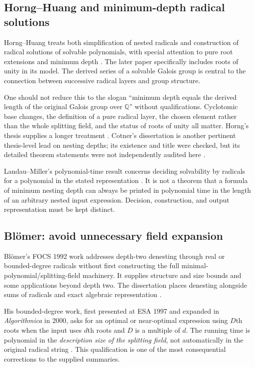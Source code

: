 \documentclass[11pt,a4paper]{article}
\numberwithin{equation}{section}
\theoremstyle{definition}\newtheorem{definition}[theorem]{Definition}
\theoremstyle{remark}\newtheorem{remark}[theorem]{Remark}
\newcommand{\Q}{\mathbb Q}\newcommand{\R}{\mathbb R}\newcommand{\C}{\mathbb C}\newcommand{\Z}{\mathbb Z}
\begin{document}
\subsection{Horng--Huang and minimum-depth radical solutions}
Horng--Huang treats both simplification of nested radicals and construction of radical solutions of solvable polynomials, with special attention to pure root extensions and minimum depth \cite{horng90,horng99}. The later paper specifically includes roots of unity in its model. The derived series of a solvable Galois group is central to the connection between successive radical layers and group structure.

One should not reduce this to the slogan ``minimum depth equals the derived length of the original Galois group over $\Q$'' without qualifications. Cyclotomic base changes, the definition of a pure radical layer, the chosen element rather than the whole splitting field, and the status of roots of unity all matter. Horng's thesis supplies a longer treatment \cite{horngThesis}. Cotner's dissertation is another pertinent thesis-level lead on nesting depths; its existence and title were checked, but its detailed theorem statements were not independently audited here \cite{cotner}.

Landau--Miller's polynomial-time result concerns deciding solvability by radicals for a polynomial in the stated representation \cite{landauMiller}. It is not a theorem that a formula of minimum nesting depth can always be printed in polynomial time in the length of an arbitrary nested input expression. Decision, construction, and output representation must be kept distinct.

\subsection{Bl\"omer: avoid unnecessary field expansion}
Bl\"omer's FOCS 1992 work addresses depth-two denesting through real or bounded-degree radicals without first constructing the full minimal-polynomial/splitting-field machinery. It supplies structure and size bounds and some applications beyond depth two. The dissertation places denesting alongside sums of radicals and exact algebraic representation \cite{bloemer92,bloemer93}.

His bounded-degree work, first presented at ESA 1997 and expanded in \emph{Algorithmica} in 2000, asks for an optimal or near-optimal expression using $D$th roots when the input uses $d$th roots and $D$ is a multiple of $d$. The running time is polynomial in the \emph{description size of the splitting field}, not automatically in the original radical string \cite{bloemer00}. This qualification is one of the most consequential corrections to the supplied summaries.
\end{document}

